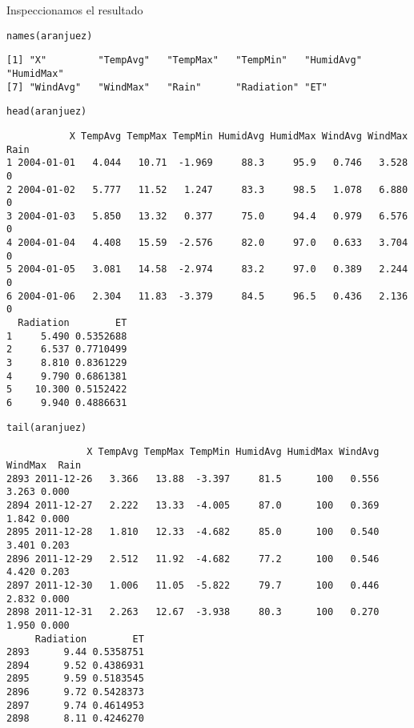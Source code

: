 \documentclass[aspectratio=169, usenames,svgnames,dvipsnames]{beamer}
\begin{document}
\begin{frame}[label={sec:orgb38e873},fragile]{Inspeccionamos el resultado}
 \lstset{language=r,label= ,caption= ,captionpos=b,numbers=none}
\begin{lstlisting}
names(aranjuez)
\end{lstlisting}

\begin{verbatim}
[1] "X"         "TempAvg"   "TempMax"   "TempMin"   "HumidAvg"  "HumidMax" 
[7] "WindAvg"   "WindMax"   "Rain"      "Radiation" "ET"
\end{verbatim}


\lstset{language=r,label= ,caption= ,captionpos=b,numbers=none}
\begin{lstlisting}
head(aranjuez)
\end{lstlisting}

\begin{verbatim}
           X TempAvg TempMax TempMin HumidAvg HumidMax WindAvg WindMax Rain
1 2004-01-01   4.044   10.71  -1.969     88.3     95.9   0.746   3.528    0
2 2004-01-02   5.777   11.52   1.247     83.3     98.5   1.078   6.880    0
3 2004-01-03   5.850   13.32   0.377     75.0     94.4   0.979   6.576    0
4 2004-01-04   4.408   15.59  -2.576     82.0     97.0   0.633   3.704    0
5 2004-01-05   3.081   14.58  -2.974     83.2     97.0   0.389   2.244    0
6 2004-01-06   2.304   11.83  -3.379     84.5     96.5   0.436   2.136    0
  Radiation        ET
1     5.490 0.5352688
2     6.537 0.7710499
3     8.810 0.8361229
4     9.790 0.6861381
5    10.300 0.5152422
6     9.940 0.4886631
\end{verbatim}

\lstset{language=r,label= ,caption= ,captionpos=b,numbers=none}
\begin{lstlisting}
tail(aranjuez)
\end{lstlisting}

\begin{verbatim}
              X TempAvg TempMax TempMin HumidAvg HumidMax WindAvg WindMax  Rain
2893 2011-12-26   3.366   13.88  -3.397     81.5      100   0.556   3.263 0.000
2894 2011-12-27   2.222   13.33  -4.005     87.0      100   0.369   1.842 0.000
2895 2011-12-28   1.810   12.33  -4.682     85.0      100   0.540   3.401 0.203
2896 2011-12-29   2.512   11.92  -4.682     77.2      100   0.546   4.420 0.203
2897 2011-12-30   1.006   11.05  -5.822     79.7      100   0.446   2.832 0.000
2898 2011-12-31   2.263   12.67  -3.938     80.3      100   0.270   1.950 0.000
     Radiation        ET
2893      9.44 0.5358751
2894      9.52 0.4386931
2895      9.59 0.5183545
2896      9.72 0.5428373
2897      9.74 0.4614953
2898      8.11 0.4246270
\end{verbatim}
\end{frame}
\end{document}
